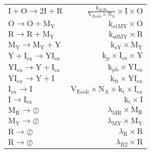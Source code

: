 \documentclass[11pt]{article}
\begin{document}
\begin{table}
\begin{tabular}{l|r}
        \\
            $ \text{I} + \text{O} \rightarrow 2\text{I} + \text{R} $
               &
            $ \frac{\text{k}_{\text{dr2b}}}{\text{V}_{\text{Ecoli}} \times \text{N}_{\text{A}}}\times \text{I} \times \text{O} $
        \\
            $ \text{O} \rightarrow \text{O} + \text{M}_{\text{Y}} $
               &
            $ \text{k}_{\text{s1MY}} \times \text{O} $
        \\
            $ \text{R} \rightarrow \text{R} + \text{M}_{\text{Y}} $
               &
            $ \text{k}_{\text{s0MY}} \times \text{R} $
        \\
            $ \text{M}_{\text{Y}} \rightarrow \text{M}_{\text{Y}} + \text{Y} $
               &
            $ \text{k}_{\text{sY}} \times \text{M}_{\text{Y}} $
        \\
            $ \text{Y} + \text{I}_{\text{ex}} \rightarrow \text{YI}_{\text{ex}} $
               &
            $ \text{k}_{\text{p}} \times \text{I}_{\text{ex}} \times \text{Y} $
        \\
            $ \text{YI}_{\text{ex}} \rightarrow \text{Y} + \text{I}_{\text{ex}} $
               &
            $ \text{k}_{\text{pb}} \times \text{YI}_{\text{ex}} $
        \\
            $ \text{YI}_{\text{ex}} \rightarrow \text{Y} + \text{I} $
               &
            $ \text{k}_{\text{ft}} \times \text{YI}_{\text{ex}} $
        \\
            $ \text{I}_{\text{ex}} \rightarrow \text{I} $
               &
            $ \text{V}_{\text{Ecoli}} \times \text{N}_{\text{A}} \times \text{k}_{\text{t}} \times \text{I}_{\text{ex}} $
        \\
            $ \text{I} \rightarrow \text{I}_{\text{ex}} $
               &
            $ \text{k}_{\text{t}} \times \text{I} $
        \\
            $ \text{M}_{\text{R}} \rightarrow \oslash $
               &
            $ \lambda_{\text{MR}} \times \text{M}_{\text{R}} $
        \\
            $ \text{M}_{\text{Y}} \rightarrow \oslash $
               &
            $ \lambda_{\text{MY}} \times \text{M}_{\text{Y}} $
        \\
            $ \text{R} \rightarrow \oslash $
               &
            $ \lambda_{\text{R}} \times \text{R} $
        \\
            $ \text{R} \rightarrow \oslash $
               &
            $ \lambda_{\text{R2}} \times \text{R} $

\end{tabular}
\end{table}
\end{document}
